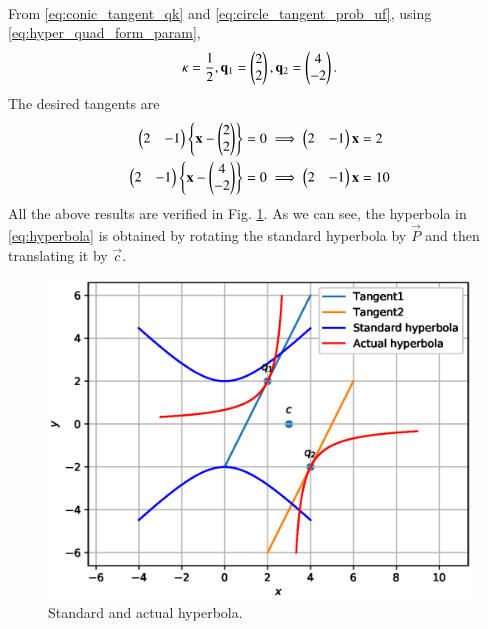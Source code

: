 \begin{enumerate}[label=\thesection.\arabic*.,ref=\thesection.\theenumi]
\begin{align}
\end{align}
%
From \eqref{eq:conic_tangent_qk} and \eqref{eq:circle_tangent_prob_uf}, using \eqref{eq:hyper_quad_form_param},
\begin{align}
\kappa = \frac{1}{2}, \mathbf{q}_1 = \begin{pmatrix}2\\2\end{pmatrix}, \mathbf{q}_2 = \begin{pmatrix}4\\-2\end{pmatrix}.
\end{align}
%
The desired tangents are
\begin{align}
\begin{pmatrix}2 & -1\end{pmatrix}\left\{\mathbf{x}-\begin{pmatrix}2\\2\end{pmatrix}\right\} &= 0 \implies \begin{pmatrix}2 & -1\end{pmatrix} \mathbf{x} = 2
\\
\begin{pmatrix}2 & -1\end{pmatrix}\left\{\mathbf{x}-\begin{pmatrix}4\\-2\end{pmatrix}\right\} &= 0 \implies \begin{pmatrix}2 & -1\end{pmatrix} \mathbf{x} = 10
\end{align}
All the above results are verified in Fig. \ref{fig:hyper_tangent}.  As we can see, the hyperbola in \eqref{eq:hyperbola} is obtained by rotating the standard hyperbola by $\vec{P}$	and then translating it by $\vec{c}$.

\begin{figure}[!ht]
\centering
\includegraphics[width=\columnwidth]{./figs/hyper/hyper_tangent.eps}
\caption{Standard and actual hyperbola.}
\label{fig:hyper_tangent}	
\end{figure}

\end{enumerate}
